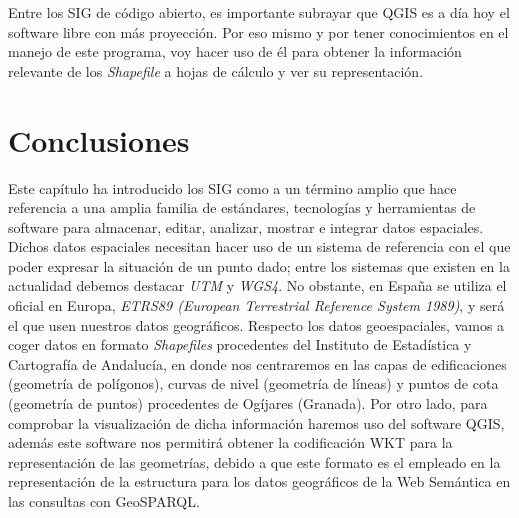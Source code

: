 Entre los SIG de código abierto, es importante subrayar que QGIS es a día hoy el software libre con más proyección. Por eso mismo y por tener conocimientos en el manejo de este programa, voy hacer uso de él para obtener la información relevante de los \textit{Shapefile} a hojas de cálculo y ver su representación. %



\section{Conclusiones}

Este capítulo ha introducido los SIG como a un término amplio que hace referencia a una amplia familia de estándares, tecnologías y herramientas de software para almacenar, editar, analizar, mostrar e integrar datos espaciales. Dichos datos espaciales necesitan hacer uso de un sistema de referencia con el que poder expresar la situación de un punto dado; entre los sistemas que existen en la actualidad debemos destacar \textit{UTM} y \textit{WGS4}. No obstante, en España se utiliza el oficial en Europa, \textit{ETRS89 (European Terrestrial Reference System 1989)}, y será el que usen nuestros datos geográficos. Respecto los datos geoespaciales, vamos a coger datos en formato \textit{Shapefiles} procedentes del Instituto de Estadística y Cartografía de Andalucía, en donde nos centraremos en las capas de edificaciones (geometría de polígonos), curvas de nivel (geometría de líneas) y puntos de cota (geometría de puntos) procedentes de Ogíjares (Granada). Por otro lado, para comprobar la visualización de dicha información haremos uso del software QGIS, además este software nos permitirá obtener la codificación WKT para la representación de las geometrías, debido a que este formato es el empleado en la representación de la estructura para los datos geográficos de la Web Semántica en las consultas con GeoSPARQL.

